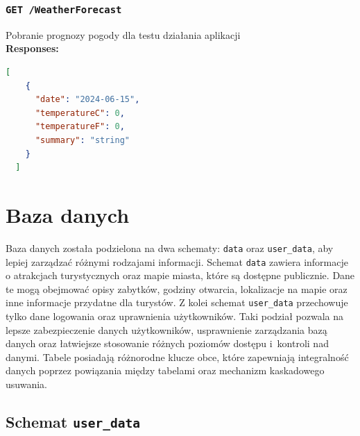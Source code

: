 \subsubsection{\lstinline[language=http]{GET /WeatherForecast}}
Pobranie prognozy pogody dla testu działania aplikacji\\
\textbf{Responses:}
\begin{lstlisting}[language=json]
  [
    {
      "date": "2024-06-15",
      "temperatureC": 0,
      "temperatureF": 0,
      "summary": "string"
    }
  ]
\end{lstlisting}

\section{Baza danych}
Baza danych została podzielona na dwa schematy: \texttt{data} oraz \texttt{user\_data}, aby lepiej zarządzać różnymi rodzajami informacji.
Schemat \texttt{data} zawiera informacje o atrakcjach turystycznych oraz mapie miasta, które są dostępne publicznie.
Dane te mogą obejmować opisy zabytków, godziny otwarcia, lokalizacje na mapie oraz inne informacje przydatne dla turystów.\newline
Z kolei schemat \texttt{user\_data} przechowuje tylko dane logowania oraz uprawnienia użytkowników.
Taki podział pozwala na lepsze zabezpieczenie danych użytkowników, usprawnienie zarządzania bazą danych oraz łatwiejsze stosowanie różnych poziomów dostępu i~kontroli nad danymi.
Tabele posiadają różnorodne klucze obce, które zapewniają integralność danych poprzez powiązania między tabelami oraz mechanizm kaskadowego usuwania.

\subsection{Schemat \texttt{user\_data}}

